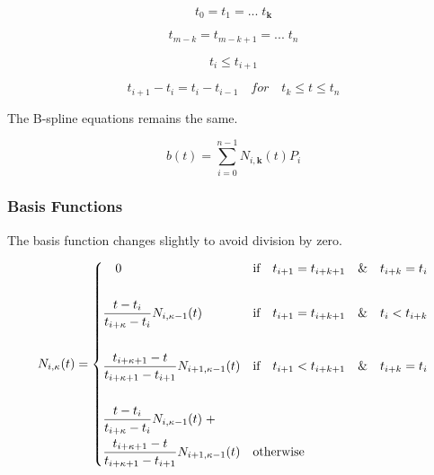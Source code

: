 \documentclass{article}
\begin{document}
\begin{equation}
    t_0 = t_1 = ... \; t_\textbf{k}
\end{equation}

\begin{equation}
    t_{m-k} = t_{m-k+1} = ... \; t_n
\end{equation}

\begin{equation}
    t_i \leq t_{i+1}
\end{equation}

\begin{equation}
t_{i+1} - t_i = t_{i} - t_{i-1} \quad for \quad t_k \leq t \leq t_n
\end{equation}

The B-spline equations remains the same.

  \begin{equation}
      b(t) = \sum^{n-1}_{i=0} N_{i,\textbf{k}}(t) P_i
  \end{equation}
  
 \subsubsection{Basis Functions}

The basis function changes slightly to avoid division by zero.


  \begin{equation} \label{eq:Basis function equation clamped}
  N_{i,\kappa}(t) = \begin{dcases}  \quad 0 & \text{if} \quad t_{i+1} = t_{i+k+1} \quad  \text{\&} \quad t_{i+k} = t_{i} \\\\ 
  \frac{t - t_i}{t_{i+\kappa} - t_i} N_{i,\kappa-1}(t) &  \text{if} \quad t_{i+1} = t_{i+k+1}  \quad  \& \quad t_{i} < t_{i+k} \\\\
  \frac{t_{i+\kappa+1} - t}{t_{i+\kappa+1}-t_{i+1}} N_{i+1 , \kappa-1}(t) & \text{if} \quad  t_{i+1} < t_{i+k+1} \quad \& \quad  t_{i+k} = t_{i}\\\\
  \frac{t - t_i}{t_{i+\kappa} - t_i} N_{i,\kappa-1}(t) \; +  \\ \frac{t_{i+\kappa+1} - t}{t_{i+\kappa+1}-t_{i+1}} N_{i+1 , \kappa-1}(t) & \text{otherwise}
  \end{dcases}
  \end{equation}
  
 \hspace{1cm}
 
\end{document}
